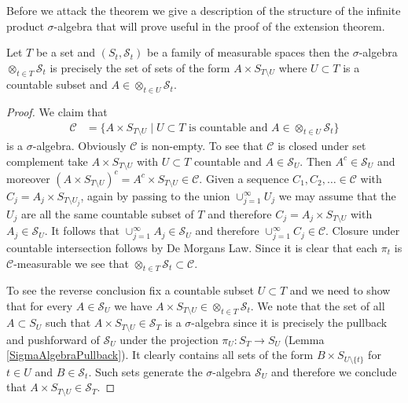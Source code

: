 Before we attack the theorem we give a description of the structure of the
infinite product $\sigma$-algebra that will prove useful in the proof
of the extension theorem.
\begin{lem}\label{ProductSigmaAlgebraAsCountableCylinderSets}Let $T$ be a set and $(S_t, \mathcal{S}_t)$ be a family of
  measurable spaces then the $\sigma$-algebra $\otimes_{t \in T}
  \mathcal{S}_t$ is precisely the set of sets of the form $A \times
  S_{T \setminus U}$ where $U \subset T$ is a countable subset and $A
  \in \otimes_{t \in U} \mathcal{S}_t$.
\end{lem}
\begin{proof}
We claim that 
\begin{align*}
\mathcal{C} &= \lbrace A \times
  S_{T \setminus U} \mid U \subset T \text{ is countable and } A
  \in \otimes_{t \in U} \mathcal{S}_t \rbrace
\end{align*}
is a $\sigma$-algebra.  Obviously $\mathcal{C}$ is non-empty.  To see that $\mathcal{C}$ is closed under set
complement take $A \times S_{T \setminus U}$ with $U \subset T$
countable and $A \in \mathcal{S}_U$.  Then $A^c  \in \mathcal{S}_U$
and moreover $(A \times S_{T \setminus U})^c = A^c \times S_{T
  \setminus U} \in \mathcal{C}$.  
Given a sequence $C_1, C_2, \dotsc \in \mathcal{C}$
with $C_j = A_j \times S_{T \setminus U_j}$, again by passing to the
union $\cup_{j=1}^\infty U_j$ we may assume that the $U_j$ are all the
same countable subset of $T$ and therefore $C_j = A_j \times S_{T
  \setminus U}$ with $A_j \in \mathcal{S}_U$.  It follows that
$\cup_{j=1}^\infty A_j \in \mathcal{S}_U$ and therefore
$\cup_{j=1}^\infty C_j \in \mathcal{C}$.  Closure under countable
intersection follows by De Morgans Law.  Since it is clear that each
$\pi_t$ is $\mathcal{C}$-measurable we see that $\otimes_{t \in T}
\mathcal{S}_t \subset \mathcal{C}$.

To see the reverse conclusion fix a countable subset $U \subset T$ and
we need to show that for every $A \in \mathcal{S}_U$ we have $A \times
S_{T \setminus U} \in \otimes_{t \in T}
\mathcal{S}_t$.  We note that the set of all  $A \subset S_U$ such that $A \times
S_{T \setminus U} \in \mathcal{S}_T$ is a $\sigma$-algebra since 
it is precisely the pullback and pushforward of $\mathcal{S}_U$ under the projection
$\pi_U : S_T \to S_U$ (Lemma \ref{SigmaAlgebraPullback}).  It clearly
contains all sets of the form $B \times S_{U \setminus \lbrace t
  \rbrace}$ for $t \in U$ and $B \in \mathcal{S}_t$.  Such sets
generate the $\sigma$-algebra $\mathcal{S}_U$  and therefore we
conclude that $A \times S_{T \setminus U} \in \mathcal{S}_T$.
\end{proof}


